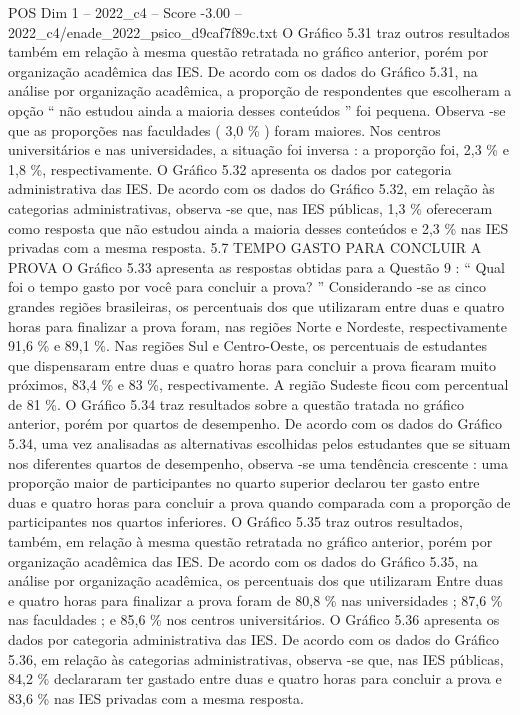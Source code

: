 \begin{textsample}{POS Dim 1 – 2022\_c4 – Score -3.00 – 2022\_c4/enade\_2022\_psico\_d9caf7f89c.txt}
O Gráfico 5.31 traz outros resultados também em relação à mesma questão retratada no gráfico anterior, porém por organização acadêmica das IES.
De acordo com os dados do Gráfico 5.31, na análise por organização acadêmica, a proporção de respondentes que escolheram a opção “ não estudou ainda a maioria desses conteúdos ” foi pequena.
Observa -se que as proporções nas faculdades ( 3,0 \% ) foram maiores.
Nos centros universitários e nas universidades, a situação foi inversa : a proporção foi, 2,3 \% e 1,8 \%, respectivamente.
O Gráfico 5.32 apresenta os dados por categoria administrativa das IES.
De acordo com os dados do Gráfico 5.32, em relação às categorias administrativas, observa -se que, nas IES públicas, 1,3 \% ofereceram como resposta que não estudou ainda a maioria desses conteúdos e 2,3 \% nas IES privadas com a mesma resposta. 5.7 TEMPO GASTO PARA CONCLUIR A PROVA O Gráfico 5.33 apresenta as respostas obtidas para a Questão 9 : “ Qual foi o tempo gasto por você para concluir a prova? ” Considerando -se as cinco grandes regiões brasileiras, os percentuais dos que utilizaram entre duas e quatro horas para finalizar a prova foram, nas regiões Norte e Nordeste, respectivamente 91,6 \% e 89,1 \%.
Nas regiões Sul e Centro-Oeste, os percentuais de estudantes que dispensaram entre duas e quatro horas para concluir a prova ficaram muito próximos, 83,4 \% e 83 \%, respectivamente.
A região Sudeste ficou com percentual de 81 \%.
O Gráfico 5.34 traz resultados sobre a questão tratada no gráfico anterior, porém por quartos de desempenho.
De acordo com os dados do Gráfico 5.34, uma vez analisadas as alternativas escolhidas pelos estudantes que se situam nos diferentes quartos de desempenho, observa -se uma tendência crescente : uma proporção maior de participantes no quarto superior declarou ter gasto entre duas e quatro horas para concluir a prova quando comparada com a proporção de participantes nos quartos inferiores.
O Gráfico 5.35 traz outros resultados, também, em relação à mesma questão retratada no gráfico anterior, porém por organização acadêmica das IES.
De acordo com os dados do Gráfico 5.35, na análise por organização acadêmica, os percentuais dos que utilizaram Entre duas e quatro horas para finalizar a prova foram de 80,8 \% nas universidades ; 87,6 \% nas faculdades ; e 85,6 \% nos centros universitários.
O Gráfico 5.36 apresenta os dados por categoria administrativa das IES.
De acordo com os dados do Gráfico 5.36, em relação às categorias administrativas, observa -se que, nas IES públicas, 84,2 \% declararam ter gastado entre duas e quatro horas para concluir a prova e 83,6 \% nas IES privadas com a mesma resposta.

\end{textsample}
